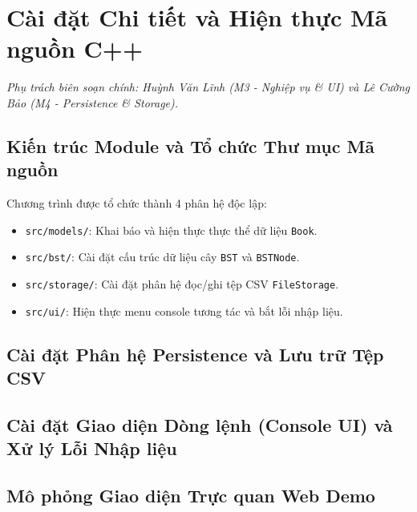 \chapter{Cài đặt Chi tiết và Hiện thực Mã nguồn C++}
\label{chap:chuong3}

\textit{Phụ trách biên soạn chính: Huỳnh Văn Lĩnh (M3 - Nghiệp vụ \& UI) và Lê Cường Bảo (M4 - Persistence \& Storage).}

\section{Kiến trúc Module và Tổ chức Thư mục Mã nguồn}
Chương trình được tổ chức thành 4 phân hệ độc lập:
\begin{itemize}
    \item \texttt{src/models/}: Khai báo và hiện thực thực thể dữ liệu \texttt{Book}.
    \item \texttt{src/bst/}: Cài đặt cấu trúc dữ liệu cây \texttt{BST} và \texttt{BSTNode}.
    \item \texttt{src/storage/}: Cài đặt phân hệ đọc/ghi tệp CSV \texttt{FileStorage}.
    \item \texttt{src/ui/}: Hiện thực menu console tương tác và bắt lỗi nhập liệu.
\end{itemize}

\section{Cài đặt Phân hệ Persistence và Lưu trữ Tệp CSV}
\section{Cài đặt Giao diện Dòng lệnh (Console UI) và Xử lý Lỗi Nhập liệu}
\section{Mô phỏng Giao diện Trực quan Web Demo}
